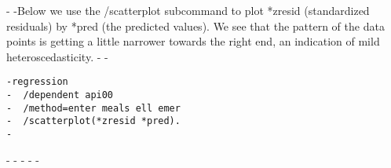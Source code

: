 -
-Below we use the /scatterplot subcommand to plot *zresid (standardized residuals) by *pred (the predicted values).  We see that the pattern of the data points is getting a little narrower towards the right end, an indication of mild heteroscedasticity.
-
-\begin{verbatim}
-regression
-  /dependent api00
-  /method=enter meals ell emer
-  /scatterplot(*zresid *pred).
-\end{verbatim}
-
-
-%
-%
-%
 
